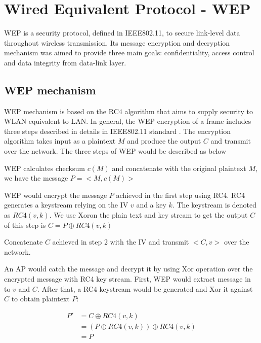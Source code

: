 \section{Wired Equivalent Protocol - WEP}


\ac{WEP} is a security protocol, defined in \ac{IEEE}802.11, to secure link-level data throughout wireless transmission. Its message encryption and decryption mechanism was aimed to provide three main goals: confidentiality, access control and data integrity from data-link layer.
\subsection{WEP mechanism}\label{wep_mec}
\ac{WEP} mechanism is based on the \ac{RC4} algorithm\cite{mousa2006evaluation} that aims to supply security to \ac{WLAN} equivalent to \ac{LAN}. In general, the \ac{WEP} encryption of a frame includes three steps described in details in \ac{IEEE}802.11 standard \cite{al2006ieee}. The encryption algorithm takes input as a plaintext $M$ and produce the output $C$ and transmit over the network. The three steps of \ac{WEP} would be described as below
\begin{steps}
	\item \ac{WEP} calculates checksum $c(M)$ and concatenate with the original plaintext $M$, we have the message $P = <M, c(M)>$
	\item \ac{WEP} would encrypt the message $P$ achieved in the first step using \ac{RC4}. \ac{RC4} generates a keystream relying on the \ac{IV} $v$ and a key $k$. The keystream is denoted as $RC4(v,k)$. We use \ac{Xor}on the plain text and key stream to get the output $C$ of this step is $C = P \oplus RC4(v,k)$
	\item Concatenate $C$ achieved in step 2 with the \ac{IV} and transmit $<C, v>$ over the network.
\end{steps}

An \ac{AP} would catch the message and decrypt it by using \ac{Xor} operation over the encrypted message with \ac{RC4} key stream.  First, \ac{WEP} would extract message in to $v$ and $C$. After that, a \ac{RC4} keystream would be generated and \ac{Xor} it against $C$ to obtain plaintext $P$:
\begin{center}
	\begin{align}
	P'&= C \oplus RC4(v, k) \\
	&= (P \oplus RC4(v, k)) \oplus RC4(v, k) \\
	&= P
	\end{align}
\end{center}


